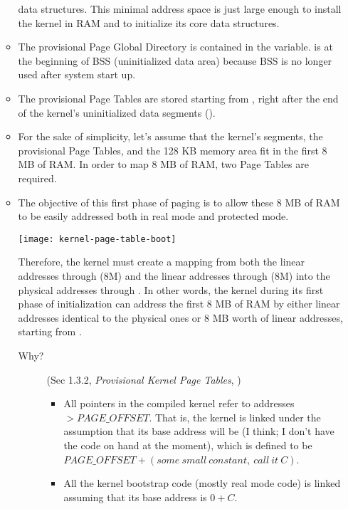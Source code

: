 \begin{itemize}
\begin{itemize}
    data structures. This minimal address space is just large enough to install the kernel
    in RAM and to initialize its core data structures.
  \item The provisional Page Global Directory is contained in the 
    variable.  is at the beginning of BSS (uninitialized data area)
    because BSS is no longer used after system start up.
  \item The provisional Page Tables are stored starting from , right after the
    end of the kernel's uninitialized data segments ().
  \item For the sake of simplicity, let's assume that the kernel's segments, the
    provisional Page Tables, and the 128 KB memory area fit in the first 8 MB of RAM. In
    order to map 8 MB of RAM, two Page Tables are required.
  \item The objective of this first phase of paging is to allow these 8 MB of RAM to be
    easily addressed both in real mode and protected mode.
    \begin{center}
      \texttt{[image: kernel-page-table-boot]}
    \end{center}
    Therefore, the kernel must create a mapping from both the linear addresses
     through  (8M) and the linear addresses
     through  (8M) into the physical addresses
     through . In other words, the kernel during its
    first phase of initialization can address the first 8 MB of RAM by either linear
    addresses identical to the physical ones or 8 MB worth of linear addresses, starting
    from .
    \begin{description}
    \item[Why?] (Sec 1.3.2, \emph{Provisional Kernel Page Tables}, \cite{abhishek2002memory})
      \begin{itemize}
      \item All pointers in the compiled kernel refer to addresses $> PAGE\_OFFSET$. That
        is, the kernel is linked under the assumption that its base address will be
         (I think; I don't have the code on hand at the moment), which
        is defined to be $PAGE\_OFFSET+(some\ small\ constant,\ call\ it\ C)$.
      \item All the kernel bootstrap code (mostly real mode code) is linked assuming that
        its base address is $0+C$.
      \end{itemize}


\end{description}
\end{itemize}
\end{itemize}

